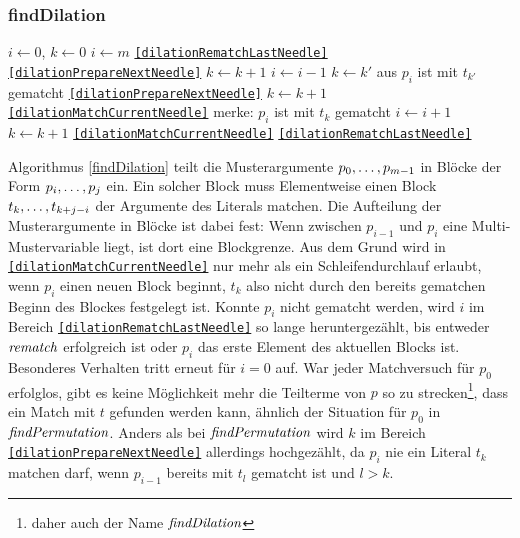 \subsubsection {findDilation}
\begin{algorithm}
\DontPrintSemicolon
\caption{$\Const{findDilation} \colon M \times T \times \mathit{Bool} \rightarrow \mathit{Bool}$}\label{findDilation}
\Let $i \leftarrow 0$, $k \leftarrow 0$\;
 {
	$i \leftarrow m$\;
	\Goto \texttt{\ref{dilationRematchLastNeedle}}\;
}
 {
}
 {
}
 \label{dilationMatchCurrentNeedle} 
 {
	 { 
		 {
			\Goto \texttt{\ref{dilationPrepareNextNeedle}}\;
		}
		$k \leftarrow k + 1$\;
	}
}
 \label{dilationRematchLastNeedle} 
 {
	$i \leftarrow i - 1$\;
	{$k \leftarrow k'$ aus \glqq $p_{i}$ ist mit $t_{k'}$ gematcht\grqq{}}\;
	 {
		\Goto \texttt{\ref{dilationPrepareNextNeedle}}\;
	}
	 {
		$k \leftarrow k + 1$\;
	\Goto \texttt{\ref{dilationMatchCurrentNeedle}}\;
	}
}
\;
 \label{dilationPrepareNextNeedle} 
merke: $p_i$ ist mit $t_k$ gematcht\;
$i \leftarrow i + 1$\;
$k \leftarrow k + 1$\;
 {
	\Goto \texttt{\ref{dilationMatchCurrentNeedle}}\;
}
 {
	\Goto \texttt{\ref{dilationRematchLastNeedle}}\;
}
\end{algorithm}


Algorithmus \ref{findDilation} teilt die Musterargumente ${p}_{0}, \dots, {p}_{m-1}$ in Blöcke der Form ${p}_{i}, \dots, {p}_{j}$ ein. Ein solcher Block muss Elementweise einen Block ${t}_{k}, \dots, {t}_{k + j - i}$ der Argumente des Literals matchen. Die Aufteilung der Musterargumente in Blöcke ist dabei fest: Wenn zwischen $p_{i-1}$ und $p_{i}$ eine Multi-Mustervariable liegt, ist dort eine Blockgrenze. Aus dem Grund wird in \texttt{\ref{dilationMatchCurrentNeedle}} nur mehr als ein Schleifendurchlauf erlaubt, wenn $p_i$ einen neuen Block beginnt, $t_k$ also nicht durch den bereits gematchen Beginn des Blockes festgelegt ist. 
Konnte $p_i$ nicht gematcht werden, wird  $i$ im Bereich \texttt{\ref{dilationRematchLastNeedle}} so lange heruntergezählt, bis entweder $\mathit{rematch}$ erfolgreich ist oder $p_i$ das erste Element des aktuellen Blocks ist. Besonderes Verhalten tritt erneut für $i = 0$ auf. War jeder Matchversuch für $p_0$ erfolglos, gibt es keine Möglichkeit mehr die Teilterme von $p$ so zu \glqq strecken\grqq{}\footnote{daher auch der Name $\mathit{findDilation}$}, dass ein Match mit $t$ gefunden werden kann, ähnlich der Situation für $p_0$ in $\mathit{findPermutation}$. Anders als bei $\mathit{findPermutation}$ wird $k$ im Bereich \texttt{\ref{dilationPrepareNextNeedle}} allerdings hochgezählt, da $p_i$ nie ein Literal $t_k$ matchen darf, wenn $p_{i-1}$ bereits mit $t_l$ gematcht ist und $l > k$.


